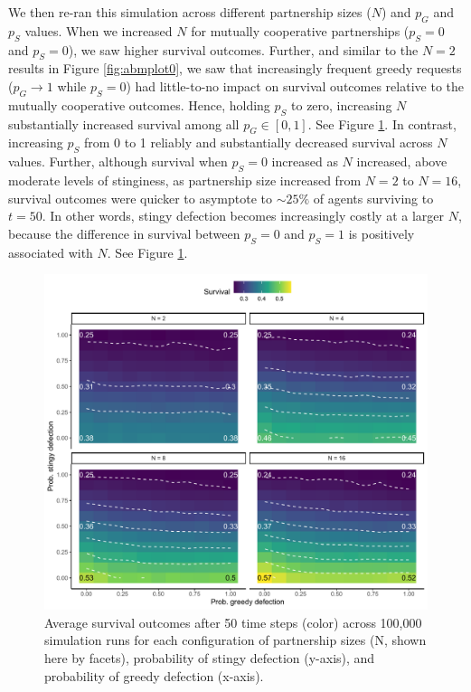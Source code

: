 \documentclass[
]{article}
\begin{document}
We then re-ran this simulation across different partnership sizes (\(N\)) and \(p_G\) and \(p_S\) values. When we increased \(N\) for mutually cooperative partnerships (\(p_S=0\) and \(p_S=0\)), we saw higher survival outcomes. Further, and similar to the \(N=2\) results in Figure \ref{fig:abmplot0}, we saw that increasingly frequent greedy requests (\(p_G \rightarrow 1\) while \(p_S=0\)) had little-to-no impact on survival outcomes relative to the mutually cooperative outcomes. Hence, holding \(p_S\) to zero, increasing \(N\) substantially increased survival among all \(p_G \in [0,1]\). See Figure \ref{fig:abmplot1}. In contrast, increasing \(p_S\) from 0 to 1 reliably and substantially decreased survival across \(N\) values. Further, although survival when \(p_S=0\) increased as \(N\) increased, above moderate levels of stinginess, as partnership size increased from \(N=2\) to \(N=16\), survival outcomes were quicker to asymptote to \(\sim 25\%\) of agents surviving to \(t=50\). In other words, stingy defection becomes increasingly costly at a larger \(N\), because the difference in survival between \(p_S=0\) and \(p_S=1\) is positively associated with \(N\). See Figure \ref{fig:abmplot1}.

\begin{figure}
\centering
\includegraphics{needBasedSharing-paper_files/figure-latex/abmplot1-1.pdf}
\caption{\label{fig:abmplot1}Average survival outcomes after 50 time steps (color) across 100,000 simulation runs for each configuration of partnership sizes (N, shown here by facets), probability of stingy defection (y-axis), and probability of greedy defection (x-axis).}
\end{figure}
\end{document}

